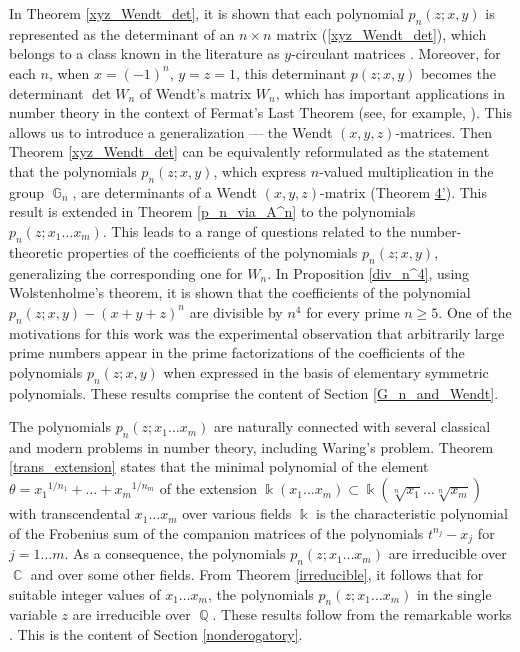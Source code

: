 \documentclass[14pt, dvipsnames]{extarticle}
\theoremstyle{definition}
\theoremstyle{definition}
\theoremstyle{remark}
\DeclareMathOperator{\kk}{\Bbbk}
\DeclareMathOperator{\Q}{\mathbb{Q}}
\DeclareMathOperator{\G}{\mathbb{G}}
\DeclareMathOperator{\Cc}{\mathbb{C}}
\begin{document}
In Theorem \ref{xyz_Wendt_det}, it is shown that each polynomial $p_n(z; x, y)$ is represented as the determinant of an $n \times n$ matrix (\ref{xyz_Wendt_det}), which belongs to a class known in the literature as $y$-circulant matrices \cite[p. 211]{Babenko}. Moreover, for each $n$, when $x = (-1)^n$, $y = z = 1$, this determinant $p(z; x, y)$ becomes the determinant $\det W_n$ of Wendt's matrix $W_n$, which has important applications in number theory in the context of Fermat’s Last Theorem (see, for example, \cite[Chapter IV, {\bf (2b)}]{Fermat_for_amateurs}). This allows us to introduce a generalization — the Wendt $(x, y, z)$-matrices. Then Theorem \ref{xyz_Wendt_det} can be equivalently reformulated as the statement that the polynomials $p_n(z; x, y)$, which express $n$-valued multiplication in the group $\G_n$, are determinants of a Wendt $(x, y, z)$-matrix (Theorem \hyperref[xyz_Wendt_and_p_n]{4’}). This result is extended in Theorem \ref{p_n_via_A^n} to the polynomials $p_n(z; x_1\dots x_m)$. This leads to a range of questions related to the number-theoretic properties of the coefficients of the polynomials $p_n(z; x, y)$, generalizing the corresponding one for $W_n$. In Proposition \ref{div_n^4}, using Wolstenholme’s theorem, it is shown that the coefficients of the polynomial $p_n(z; x, y) - (x + y + z)^n$ are divisible by $n^4$ for every prime $n \geqslant 5$. One of the motivations for this work was the experimental observation that arbitrarily large prime numbers appear in the prime factorizations of the coefficients of the polynomials $p_n(z; x, y)$ when expressed in the basis of elementary symmetric polynomials. These results comprise the content of Section \ref{G_n_and_Wendt}.

The polynomials $p_n(z; x_1\dots x_m)$ are naturally connected with several classical and modern problems in number theory, including Waring’s problem. Theorem \ref{trans_extension} states that the minimal polynomial of the element $\theta = {x_1}^{1/n_1} + \ldots + {x_m}^{1/n_m}$ of the extension $\kk(x_1\dots x_m) \subset \kk(\sqrt[n]{x_1}\dots \sqrt[n]{x_m})$ with transcendental $x_1\dots x_m$ over various fields $\kk$ is the characteristic polynomial of the Frobenius sum of the companion matrices of the polynomials $t^{n_j} - x_j$ for $j = 1\dots m$. As a consequence, the polynomials $p_n(z; x_1\dots x_m)$ are irreducible over $\Cc$ and over some other fields. From Theorem \ref{irreducible}, it follows that for suitable integer values of $x_1\dots x_m$, the polynomials $p_n(z; x_1\dots x_m)$ in the single variable $z$ are irreducible over $\Q$. These results follow from the remarkable works \cite{Albu, Ursell}. This is the content of Section \ref{nonderogatory}.
\end{document}
